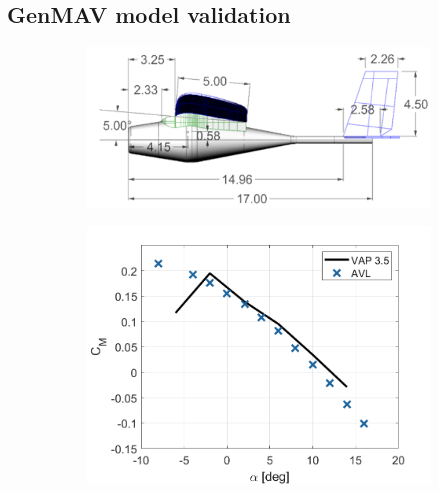 \subsection{GenMAV model validation}


\begin{figure}[H]
     \centering
     \begin{subfigure}[b]{0.45\textwidth}
          \centering
        \includegraphics[width=\textwidth]{05_Results/Figs/VAP/genMAV/dimensions.png}
            \label{fig:genMAVDimensions}

     \end{subfigure}
     \hfill
     \begin{subfigure}[b]{0.45\textwidth}
                \centering
            \includegraphics[width=\textwidth]{05_Results/Figs/VAP/genMAV/GenMAVModelValidation1.png}
             \label{fig:genMAV_Cm}
              \caption{}
     \end{subfigure}
     \hfill

        
\end{figure}


